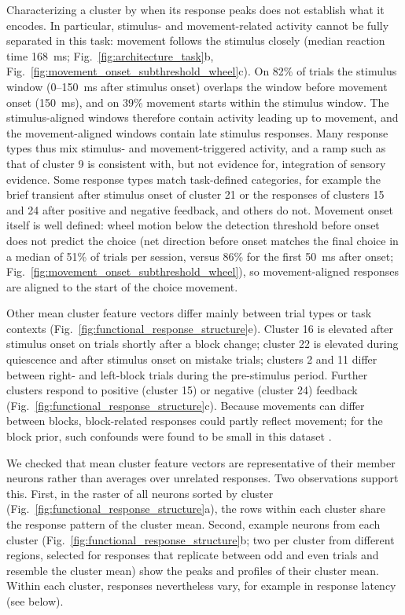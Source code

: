 \documentclass[10pt,lineno]{elife}
\begin{document}
Characterizing a cluster by when its response peaks does not establish what it encodes. In particular, stimulus- and movement-related activity cannot be fully separated in this task: movement follows the stimulus closely (median reaction time 168~ms; Fig.~\ref{fig:architecture_task}b, Fig.~\ref{fig:movement_onset_subthreshold_wheel}c). On 82\% of trials the stimulus window (0--150~ms after stimulus onset) overlaps the window before movement onset (150~ms), and on 39\% movement starts within the stimulus window. The stimulus-aligned windows therefore contain activity leading up to movement, and the movement-aligned windows contain late stimulus responses. Many response types thus mix stimulus- and movement-triggered activity, and a ramp such as that of cluster 9 is consistent with, but not evidence for, integration of sensory evidence. Some response types match task-defined categories, for example the brief transient after stimulus onset of cluster 21 or the responses of clusters 15 and 24 after positive and negative feedback, and others do not. Movement onset itself is well defined: wheel motion below the detection threshold before onset does not predict the choice (net direction before onset matches the final choice in a median of 51\% of trials per session, versus 86\% for the first 50~ms after onset; Fig.~\ref{fig:movement_onset_subthreshold_wheel}), so movement-aligned responses are aligned to the start of the choice movement.

Other mean cluster feature vectors differ mainly between trial types or task contexts (Fig.~\ref{fig:functional_response_structure}e). Cluster 16 is elevated after stimulus onset on trials shortly after a block change; cluster 22 is elevated during quiescence and after stimulus onset on mistake trials; clusters 2 and 11 differ between right- and left-block trials during the pre-stimulus period. Further clusters respond to positive (cluster 15) or negative (cluster 24) feedback (Fig.~\ref{fig:functional_response_structure}c). Because movements can differ between blocks, block-related responses could partly reflect movement; for the block prior, such confounds were found to be small in this dataset \cite{findling2023brain}.

We checked that mean cluster feature vectors are representative of their member neurons rather than averages over unrelated responses. Two observations support this. First, in the raster of all neurons sorted by cluster (Fig.~\ref{fig:functional_response_structure}a), the rows within each cluster share the response pattern of the cluster mean. Second, example neurons from each cluster (Fig.~\ref{fig:functional_response_structure}b; two per cluster from different regions, selected for responses that replicate between odd and even trials and resemble the cluster mean) show the peaks and profiles of their cluster mean. Within each cluster, responses nevertheless vary, for example in response latency (see below).
\end{document}
